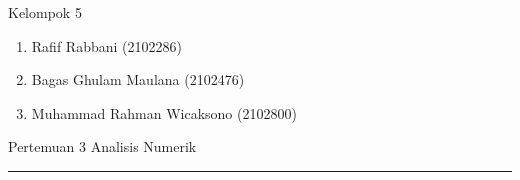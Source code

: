 \documentclass[12pt]{article}
\begin{document}
{}

\sloppy
\newcommand{\unt}{\int\displaylimits}
\newcommand{\jadi}{$\therefore\;$}
\newcommand{\rut}[1]{\sqrt{#1}}
\newcommand{\jgj}{\Leftrightarrow}
\newcommand{\tebal}[1]{\underline{\textbf{#1}}\bigskip}
\newcommand{\infak}{\int\displaylimits^{\infty}_{\infty}}
\newcommand{\lqm}{\lim\displaylimits}

\noindent Kelompok 5
\begin{enumerate}
    \item Rafif Rabbani (2102286)
    \item Bagas Ghulam Maulana (2102476)
    \item Muhammad Rahman Wicaksono (2102800)
\end{enumerate}
Pertemuan 3 Analisis Numerik\\
\noindent\rule{\textwidth}{0.2pt}\bigbreak
\end{document}
